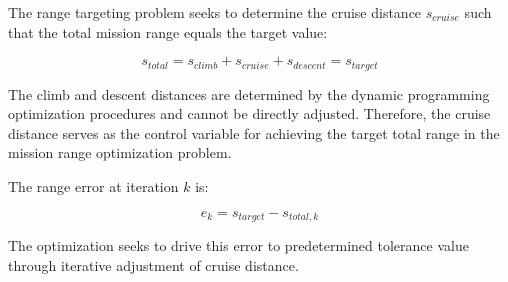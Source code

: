 The range targeting problem seeks to determine the cruise distance $s_{cruise}$ such that the total mission range equals the target value:

\begin{equation}
s_{total} = s_{climb} + s_{cruise} + s_{descent} = s_{target}
\end{equation}

The climb and descent distances are determined by the dynamic programming optimization procedures and cannot be directly adjusted. Therefore, the cruise distance serves as the control variable for achieving the target total range in the mission range optimization problem.

The range error at iteration $k$ is:

\begin{equation}
e_k = s_{target} - s_{total,k}
\end{equation}

The optimization seeks to drive this error to predetermined tolerance value through iterative adjustment of cruise distance.
